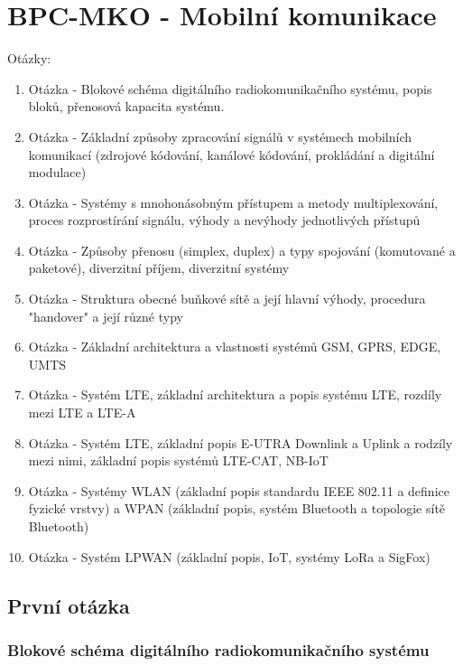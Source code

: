\part{BPC-MKO - Mobilní komunikace}
\begin{huge}
	Otázky:
	\newline
\end{huge}
\begin{enumerate}
	\item Otázka - Blokové schéma digitálního radiokomunikačního systému, popis bloků, přenosová kapacita systému.
	\item Otázka - Základní způsoby zpracování signálů v systémech mobilních komunikací (zdrojové kódování, kanálové kódování, prokládání a digitální modulace)
	\item Otázka - Systémy s mnohonásobným přístupem a metody multiplexování, proces rozprostírání signálu, výhody a nevýhody jednotlivých přístupů
	\item Otázka - Způsoby přenosu (simplex, duplex) a typy spojování (komutované a paketové), diverzitní příjem, diverzitní systémy
	\item Otázka - Struktura obecné buňkové sítě a její hlavní výhody, procedura "handover" a její různé typy
	\item Otázka - Základní architektura a vlastnosti systémů GSM, GPRS, EDGE, UMTS
	\item Otázka - Systém LTE, základní architektura a popis systému LTE, rozdíly mezi LTE a LTE-A
	\item Otázka - Systém LTE, základní popis E-UTRA Downlink a Uplink a rodzíly mezi nimi, základní popis systémů LTE-CAT, NB-IoT
	\item Otázka - Systémy WLAN (základní popis standardu IEEE 802.11 a definice fyzické vrstvy) a WPAN (základní popis, systém Bluetooth a topologie sítě Bluetooth)
	\item Otázka - Systém LPWAN (základní popis, IoT, systémy LoRa a SigFox)
\end{enumerate}
\newpage
\chapter{První otázka}
\section{Blokové schéma digitálního radiokomunikačního systému}

